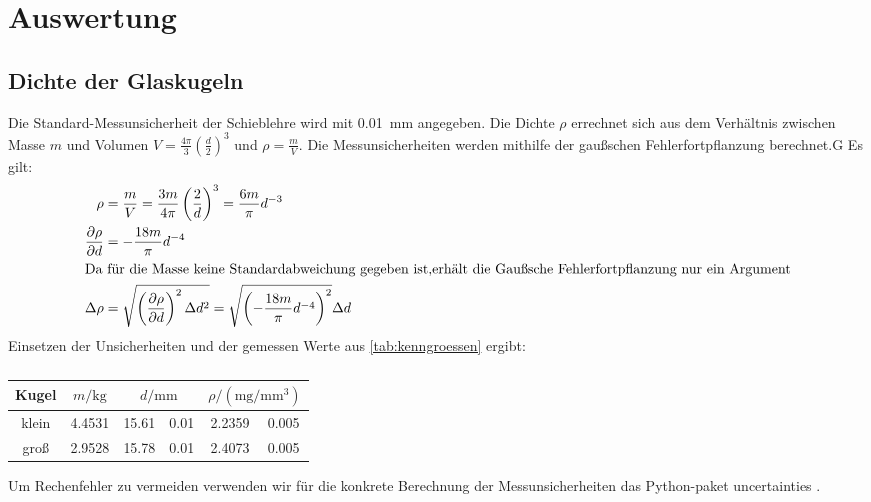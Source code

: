 \section{Auswertung}

\subsection{Dichte der Glaskugeln}

Die Standard-Messunsicherheit der Schieblehre wird mit \qty{0.01}{\mm} angegeben.
Die Dichte $\rho$ errechnet sich aus dem Verhältnis zwischen Masse $m$ und Volumen
$V=\frac{4 \pi}{3} \left(\frac{d}{2}\right)^3$ und $\rho = \frac{m}{V}$.
Die Messunsicherheiten werden mithilfe der gaußschen Fehlerfortpflanzung berechnet.G
Es gilt:
\begin{align*}
    \rho &= \frac{m}{V} = \frac{3 m}{4 \pi} \left(  \frac{2}{d} \right)^{3} = \frac{6 m}{\pi} d^{-3} \\%
    \frac{\partial \rho}{\partial d} &= -\frac{18 m}{\pi} d^{-4}  \\%
    \intertext{Da für die Masse keine Standardabweichung gegeben ist,%
     erhält die Gaußsche Fehlerfortpflanzung nur ein Argument}%
    \Delta \rho &= \sqrt{\left(\frac{\partial \rho}{\partial d} \right)^{2} \Delta d^{2} }%
    =\sqrt{\left(-\frac{18 m}{\pi} d^{-4} \right)^{2}} \Delta d \\%
\end{align*}%
%
Einsetzen der Unsicherheiten und der gemessen Werte aus \ref{tab:kenngroessen} ergibt:%
%
\begin{table}[h!]
    \caption{}
    \label{tab:Dichten}
    \centering
    \begin{tabular}[]{S S[table-format=1.4] S[table-format=2.2] @{${}\pm{}$} S[table-format=0.2] S[table-format=1.4] @{${}\pm{}$} S[table-format=0.2]}
        \toprule
        {Kugel} & {$m / \unit{\kg}$} &   &  \\
        \midrule
        {klein} & 4.4531 & 15.61 & 0.01 & 2.2359 & 0.005\\
        {groß}  & 2.9528 & 15.78 & 0.01 & 2.4073 & 0.005\\
        \bottomrule 

    \end{tabular}
\end{table}
Um Rechenfehler zu vermeiden verwenden wir für die konkrete Berechnung der Messunsicherheiten 
das Python-paket uncertainties \cite{uncertainties} \cite{python}.
